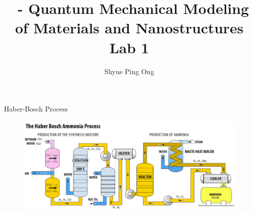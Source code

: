 \documentclass[aspectratio=169]{beamer}
\title[\classname Lab 1]{\classname~- Quantum Mechanical Modeling of Materials and Nanostructures\\Lab 1}
\author{Shyue Ping Ong}
\institute[UCSD]{University of California, San Diego\\
\medskip
}
\date{\classyear} %
\begin{document}
\begin{frame}
    \titlepage %
\end{frame}


\begin{frame}{Haber-Bosch Process}
    \begin{figure}
        \centering
        \includegraphics[width=0.8\linewidth]{lectures/figures/Lab1_Haber_Bosch.png}
    \end{figure}
    
\end{frame}
\end{document}
